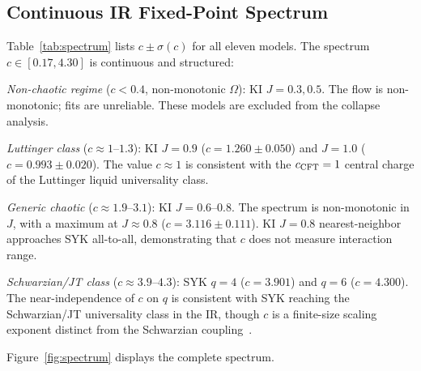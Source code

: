 \documentclass[aps,prl,twocolumn,showpacs,preprintnumbers,superscriptaddress]{revtex4-2}
\begin{document}
\subsection{Continuous IR Fixed-Point Spectrum}

Table~\ref{tab:spectrum} lists $c \pm \sigma(c)$ for all eleven models.
The spectrum $c \in [0.17, 4.30]$ is continuous and structured:

\emph{Non-chaotic regime} ($c < 0.4$, non-monotonic $\Omega$):
KI $J = 0.3, 0.5$. The flow is non-monotonic; fits are unreliable.
These models are excluded from the collapse analysis.

\emph{Luttinger class} ($c \approx 1$--$1.3$):
KI $J = 0.9$ ($c = 1.260 \pm 0.050$) and $J = 1.0$ ($c = 0.993 \pm 0.020$).
The value $c \approx 1$ is consistent with the $c_{\rm CFT} = 1$ central
charge of the Luttinger liquid universality class.

\emph{Generic chaotic} ($c \approx 1.9$--$3.1$):
KI $J = 0.6$--$0.8$. The spectrum is non-monotonic in $J$, with a maximum
at $J \approx 0.8$ ($c = 3.116 \pm 0.111$). KI $J = 0.8$ nearest-neighbor
approaches SYK all-to-all, demonstrating that $c$ does not measure
interaction range.

\emph{Schwarzian/JT class} ($c \approx 3.9$--$4.3$):
SYK $q = 4$ ($c = 3.901$) and $q = 6$ ($c = 4.300$).
The near-independence of $c$ on $q$ is consistent with SYK reaching the
Schwarzian/JT universality class in the IR, though $c$ is a finite-size
scaling exponent distinct from the Schwarzian coupling~\cite{Kitaev2015,Maldacena2016}.

Figure~\ref{fig:spectrum} displays the complete spectrum.
\end{document}
